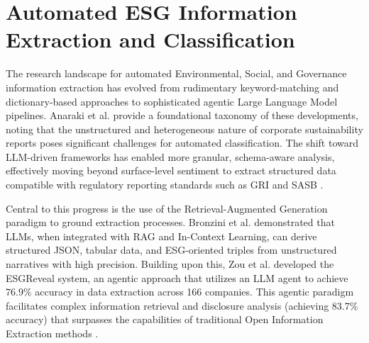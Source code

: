 \begin{landscape}
\begin{table}[p]
\begin{tabularx}{\linewidth}{|p{2.5cm}|p{2cm}|p{3cm}|p{1.8cm}|X|X|}
\end{tabularx}
\end{table}
\end{landscape}


\section{Automated ESG Information Extraction and Classification}

The research landscape for automated Environmental, Social, and Governance information extraction has evolved from rudimentary keyword-matching and dictionary-based approaches to sophisticated agentic Large Language Model pipelines. Anaraki et al.  \parencite{seyed_alireza_mousavian_anaraki_b56a1c0f} provide a foundational taxonomy of these developments, noting that the unstructured and heterogeneous nature of corporate sustainability reports poses significant challenges for automated classification. The shift toward LLM-driven frameworks has enabled more granular, schema-aware analysis, effectively moving beyond surface-level sentiment to extract structured data compatible with regulatory reporting standards such as GRI and SASB  \parencite{seyed_alireza_mousavian_anaraki_b56a1c0f}.

Central to this progress is the use of the Retrieval-Augmented Generation paradigm to ground extraction processes. Bronzini et al.  \parencite[]{marco_bronzini_bf94d949, marco_bronzini_bf94d949} demonstrated that LLMs, when integrated with RAG and In-Context Learning, can derive structured JSON, tabular data, and ESG-oriented triples from unstructured narratives with high precision. Building upon this, Zou et al.  \parencite{yi_zou_37c055f7} developed the ESGReveal system, an agentic approach that utilizes an LLM agent to achieve 76.9\% accuracy in data extraction across 166 companies. This agentic paradigm facilitates complex information retrieval and disclosure analysis (achieving 83.7\% accuracy) that surpasses the capabilities of traditional Open Information Extraction methods  \parencite[]{yi_zou_37c055f7, marco_bronzini_bf94d949}.

